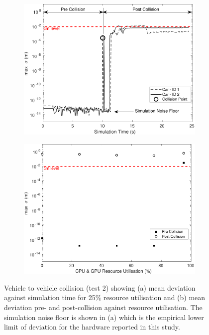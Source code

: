 \documentclass[letterpaper, 10 pt, journal, twoside]{IEEEtran}
\begin{document}
\begin{figure}[h]
    \centering
    \begin{subfigure}{.49\textwidth}
        \includegraphics[width=1\textwidth]{Other/Figures/CarsCollisionCG25_V4.pdf}
        \caption{}
        \label{CarsCollisionCG25}
    \end{subfigure}
    \begin{subfigure}{.49\textwidth}
        \includegraphics[width=1\textwidth]{Other/Figures/CarsCollisionPrePostV3.pdf}
        \caption{}
        \label{CarsCollisionPrePost}
    \end{subfigure}
    \caption{Vehicle to vehicle collision (test 2) showing (a) mean deviation against simulation time for 25\% resource utilisation and (b) mean deviation pre- and post-collision against resource utilisation. The simulation noise floor is shown in (a) which is the empirical lower limit of deviation for the hardware reported in this study.}
\end{figure}
\end{document}
